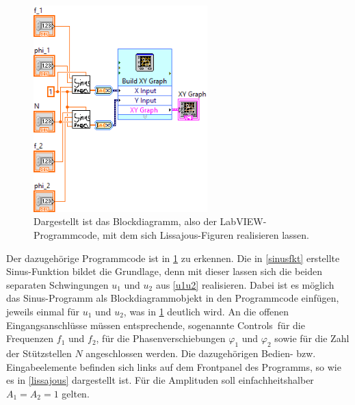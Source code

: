 \documentclass[
a4paper,
12pt,
pagesize,
ngerman
]{scrartcl}
\begin{document}
	\begin{figure}[H]
		\centering
		\includegraphics[width=0.6\textwidth]{EIRE2018Dateien/Tag1/lissajous-bilder/Lissajousd}
		\caption{Dargestellt ist das Blockdiagramm, also der LabVIEW-Programmcode, mit dem sich Lissajous-Figuren realisieren lassen.}
		\label{lissajousprogrammcode}
	\end{figure}

	\noindent Der dazugehörige Programmcode ist in \cref{lissajousprogrammcode} zu erkennen. Die in \cref{sinusfkt} erstellte Sinus-Funktion bildet die Grundlage, denn mit dieser lassen sich die beiden separaten Schwingungen $u_1$ und $u_2$ aus \cref{u1u2} realisieren. Dabei ist es möglich das Sinus-Programm als Blockdiagrammobjekt in den Programmcode einfügen, jeweils einmal für $u_1$ und $u_2$, was in \cref{lissajousprogrammcode} deutlich wird. An die offenen Eingangsanschlüsse müssen entsprechende, sogenannte \glqq Controls\grqq\ für die Frequenzen $f_1$ und $f_2$, für die Phasenverschiebungen $\varphi_1$ und $\varphi_2$ sowie für die Zahl der Stützstellen $N$ angeschlossen werden. Die dazugehörigen Bedien- bzw. Eingabeelemente befinden sich links auf dem Frontpanel des Programms, so wie es in \cref{lissajous} dargestellt ist. Für die Amplituden soll einfachheitshalber $A_1 = A_2 = 1$ gelten.
\end{document}
